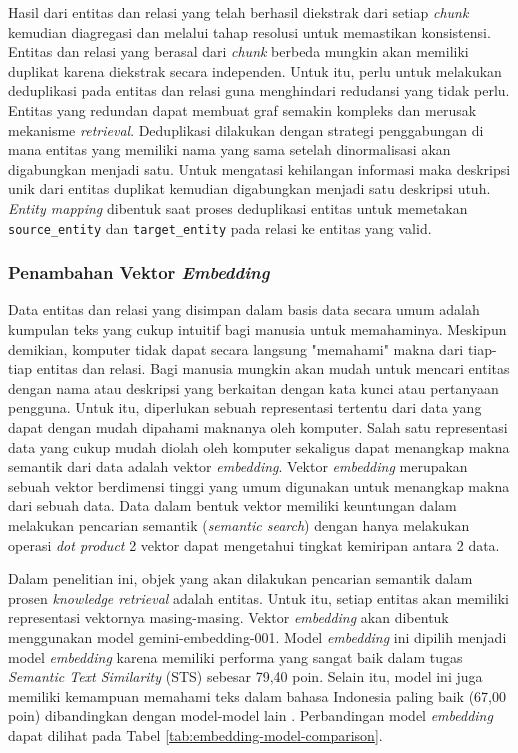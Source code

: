 Hasil dari entitas dan relasi yang telah berhasil diekstrak dari setiap \textit{chunk} kemudian diagregasi dan melalui tahap resolusi untuk memastikan konsistensi.
Entitas dan relasi yang berasal dari \textit{chunk} berbeda mungkin akan memiliki duplikat karena diekstrak secara independen.
Untuk itu, perlu untuk melakukan deduplikasi pada entitas dan relasi guna menghindari redudansi yang tidak perlu.
Entitas yang redundan dapat membuat graf semakin kompleks dan merusak mekanisme \textit{retrieval}.
Deduplikasi dilakukan dengan strategi penggabungan di mana entitas yang memiliki nama yang sama setelah dinormalisasi akan digabungkan menjadi satu.
Untuk mengatasi kehilangan informasi maka deskripsi unik dari entitas duplikat kemudian digabungkan menjadi satu deskripsi utuh.
\textit{Entity mapping} dibentuk saat proses deduplikasi entitas untuk memetakan \texttt{source\_entity} dan \texttt{target\_entity} pada relasi ke entitas yang valid.

\subsubsection{Penambahan Vektor \textit{Embedding}}

Data entitas dan relasi yang disimpan dalam basis data secara umum adalah kumpulan teks yang cukup intuitif bagi manusia untuk memahaminya.
Meskipun demikian, komputer tidak dapat secara langsung "memahami" makna dari tiap-tiap entitas dan relasi.
Bagi manusia mungkin akan mudah untuk mencari entitas dengan nama atau deskripsi yang berkaitan dengan kata kunci atau pertanyaan pengguna.
Untuk itu, diperlukan sebuah representasi tertentu dari data yang dapat dengan mudah dipahami maknanya oleh komputer.
Salah satu representasi data yang cukup mudah diolah oleh komputer sekaligus dapat menangkap makna semantik dari data adalah vektor \textit{embedding}.
Vektor \textit{embedding} merupakan sebuah vektor berdimensi tinggi yang umum digunakan untuk menangkap makna dari sebuah data.
Data dalam bentuk vektor memiliki keuntungan dalam melakukan pencarian semantik (\textit{semantic search}) dengan hanya melakukan operasi \textit{dot product} 2 vektor dapat mengetahui tingkat kemiripan antara 2 data.

Dalam penelitian ini, objek yang akan dilakukan pencarian semantik dalam prosen \textit{knowledge retrieval} adalah entitas.
Untuk itu, setiap entitas akan memiliki representasi vektornya masing-masing.
Vektor \textit{embedding} akan dibentuk menggunakan model gemini-embedding-001.
Model \textit{embedding} ini dipilih menjadi model \textit{embedding} karena memiliki performa yang sangat baik dalam tugas \textit{Semantic Text Similarity} (STS) sebesar 79,40 poin.
Selain itu, model ini juga memiliki kemampuan memahami teks dalam bahasa Indonesia paling baik (67,00 poin) dibandingkan dengan model-model lain \cite{enevoldsen2025MMTEBmassivemultilingualtextEmbeddingModelComp}.
Perbandingan model \textit{embedding} dapat dilihat pada Tabel \ref{tab:embedding-model-comparison}.

